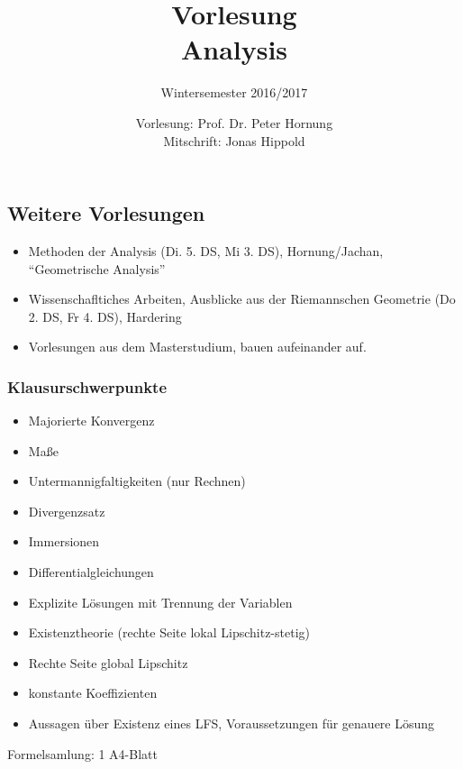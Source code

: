 \documentclass[
 a4paper,
 12pt,
 parskip=half
 ]{scrartcl}
\title{Vorlesung\\Analysis}
\subtitle{Wintersemester 2016/2017}
\author{Vorlesung: Prof. Dr. Peter Hornung\\Mitschrift: Jonas Hippold}
\theoremstyle{plain}
\theoremstyle{definition}
\numberwithin{equation}{section}
\begin{document}
\maketitle

\tableofcontents

\clearpage







\clearpage

\subsection*{Weitere Vorlesungen}
\begin{itemize}
\item Methoden der Analysis (Di. 5. DS, Mi 3. DS), Hornung/Jachan,
  ``Geometrische Analysis'' 
\item Wissenschafltiches Arbeiten, Ausblicke aus der Riemannschen Geometrie (Do
  2. DS, Fr 4. DS), Hardering
\item Vorlesungen aus dem Masterstudium, bauen aufeinander auf.
\end{itemize}

\subsubsection*{Klausurschwerpunkte}
\begin{itemize}
  \item Majorierte Konvergenz
  \item Maße
  \item Untermannigfaltigkeiten (nur Rechnen)
  \item Divergenzsatz
  \item Immersionen
  \item Differentialgleichungen
  \item Explizite Lösungen mit Trennung der Variablen
  \item Existenztheorie (rechte Seite lokal Lipschitz-stetig)
  \item Rechte Seite global Lipschitz
  \item konstante Koeffizienten
  \item Aussagen über Existenz eines LFS, Voraussetzungen für genauere Lösung
\end{itemize}
  
Formelsamlung: 1 A4-Blatt
\end{document}
